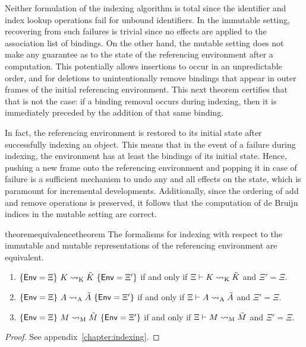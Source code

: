 Neither formulation of the indexing algorithm is total since the identifier and index lookup operations fail for unbound identifiers.
In the immutable setting, recovering from such failures is trivial since no effects are applied to the association list of bindings.
On the other hand, the mutable setting does not make any guarantee as to the state of the referencing environment after a computation.
This potentially allows insertions to occur in an unpredictable order, and for deletions to unintentionally remove bindings that appear in outer frames of the initial referencing environment.
This next theorem certifies that that is not the case: if a binding removal occurs during indexing, then it is immediately preceded by the addition of that same binding.

In fact, the referencing environment is restored to its initial state after successfully indexing an \LF object.
This means that in the event of a failure during indexing, the environment has at least the bindings of its initial state.
Hence, pushing a new frame onto the referencing environment and popping it in case of failure is a sufficient mechanism to undo any and all effects on the state, which is paramount for incremental developments.
Additionally, since the ordering of add and remove operations is preserved, it follows that the computation of de Bruijn indices in the mutable setting are correct.

\clearpage

\begin{restatable}[Equivalence]{theorem}{equivalencetheorem}\label{theorem:equivalence}
The formalisms for indexing with respect to the immutable and mutable representations of the referencing environment are equivalent.
\begin{enumerate}
\item $\{\mathsf{Env} = \Xi\}\ K \rightsquigarrow_{{\normalfont\text{K}}} \tilde K\ \{\mathsf{Env} = \Xi'\}$ if and only if $\Xi \vdash K \rightsquigarrow_{{\normalfont\text{K}}} \tilde K$ and $\Xi' = \Xi$.
\item $\{\mathsf{Env} = \Xi\}\ A \rightsquigarrow_{{\normalfont\text{A}}} \tilde A\ \{\mathsf{Env} = \Xi'\}$ if and only if $\Xi \vdash A \rightsquigarrow_{{\normalfont\text{A}}} \tilde A$ and $\Xi' = \Xi$.
\item $\{\mathsf{Env} = \Xi\}\ M \rightsquigarrow_{{\normalfont\text{M}}} \tilde M\ \{\mathsf{Env} = \Xi'\}$ if and only if $\Xi \vdash M \rightsquigarrow_{{\normalfont\text{M}}} \tilde M$ and $\Xi' = \Xi$.
\end{enumerate}
\end{restatable}

\begin{proof}
See appendix~\ref{chapter:indexing}.
\end{proof}

